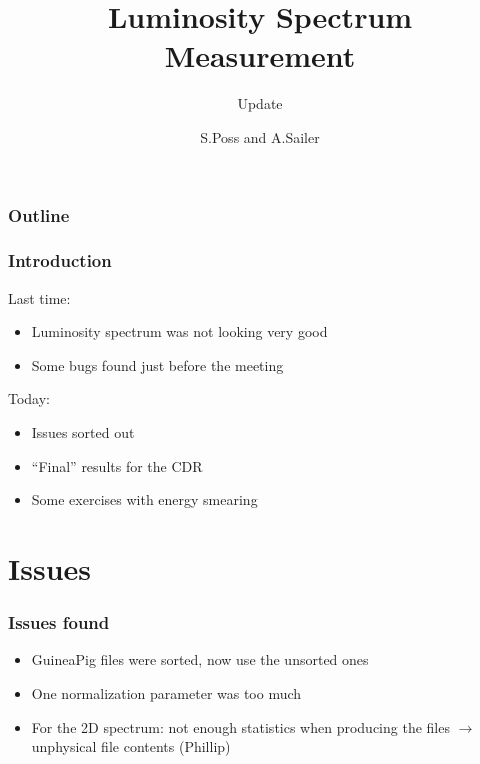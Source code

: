 \documentclass{beamer}
\author{S.Poss and A.Sailer}
\title{Luminosity Spectrum Measurement}
\subtitle{Update}
\begin{document}
\begin{frame}
\titlepage 
\end{frame}
\begin{frame}
\frametitle{Outline}
\tableofcontents
\end{frame}

\begin{frame}
\frametitle{Introduction}
Last time:
\begin{itemize}
  \item Luminosity spectrum was not looking very good
  \item Some bugs found just before the meeting
\end{itemize}
Today:
\begin{itemize}
  \item Issues sorted out
  \item ``Final'' results for the CDR
  \item Some exercises with energy smearing 
\end{itemize}
\end{frame}

\section{Issues}
\begin{frame}
\frametitle{Issues found}
\begin{itemize}
  \item GuineaPig files were sorted, now use the unsorted ones
  \item One normalization parameter was too much
  \item For the 2D spectrum: not enough statistics when producing the files
  $\to$ unphysical file contents (Phillip)
\end{itemize}
\end{frame}
\end{document}
